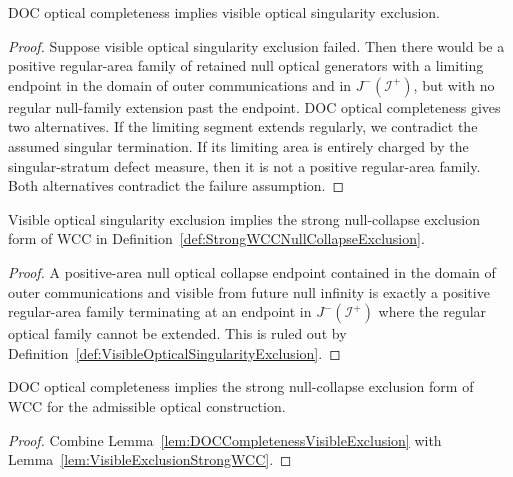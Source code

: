 \begin{lemma}\label{lem:DOCCompletenessVisibleExclusion}
DOC optical completeness implies visible optical singularity exclusion.
\end{lemma}

\begin{proof}
Suppose visible optical singularity exclusion failed. Then there would be a positive regular-area family of retained null optical generators with a limiting endpoint in the domain of outer communications and in $J^-(\mathscr I^+)$, but with no regular null-family extension past the endpoint. DOC optical completeness gives two alternatives. If the limiting segment extends regularly, we contradict the assumed singular termination. If its limiting area is entirely charged by the singular-stratum defect measure, then it is not a positive regular-area family. Both alternatives contradict the failure assumption.
\end{proof}

\begin{lemma}\label{lem:VisibleExclusionStrongWCC}
Visible optical singularity exclusion implies the strong null-collapse exclusion form of WCC in Definition~\ref{def:StrongWCCNullCollapseExclusion}.
\end{lemma}

\begin{proof}
A positive-area null optical collapse endpoint contained in the domain of outer communications and visible from future null infinity is exactly a positive regular-area family terminating at an endpoint in $J^-(\mathscr I^+)$ where the regular optical family cannot be extended. This is ruled out by Definition~\ref{def:VisibleOpticalSingularityExclusion}.
\end{proof}

\begin{corollary}\label{cor:DOCCompletenessStrongWCC}
DOC optical completeness implies the strong null-collapse exclusion form of WCC for the admissible optical construction.
\end{corollary}

\begin{proof}
Combine Lemma~\ref{lem:DOCCompletenessVisibleExclusion} with Lemma~\ref{lem:VisibleExclusionStrongWCC}.
\end{proof}

